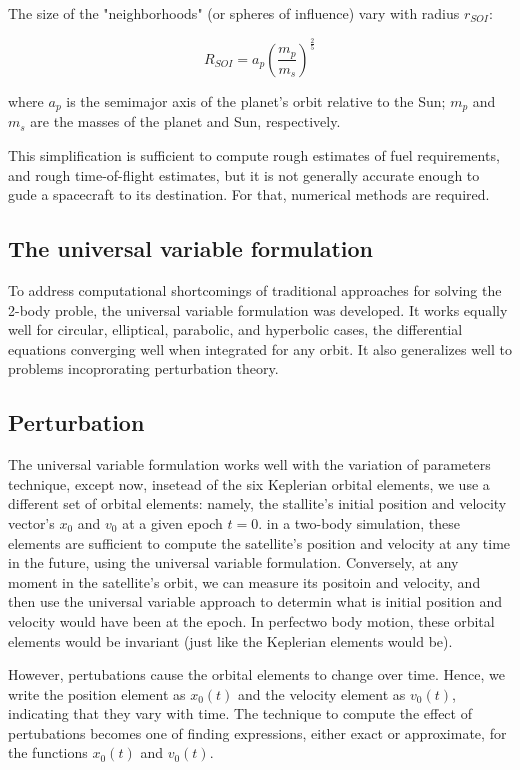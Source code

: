 \documentclass[12pt]{article}
\begin{document}
The size of the "neighborhoods" (or spheres of influence) vary with radius \(r_{SOI}\):

\[R_{SOI} = a_p{\left(\frac{m_p}{m_s}\right)}^{\frac{2}{5}}\]

where \(a_p\) is the semimajor axis of the planet's orbit relative to the Sun; \(m_p\) and \(m_s\) are the masses of the planet and Sun, respectively.

This simplification is sufficient to compute rough estimates of fuel requirements, and rough time-of-flight estimates, but it is not generally accurate enough to gude a spacecraft to its destination. For that, numerical methods are required.

\subsection{The universal variable formulation}

To address computational shortcomings of traditional approaches for solving the 2-body proble, the universal variable formulation was developed. It works equally well for circular, elliptical, parabolic, and hyperbolic cases, the differential equations converging well when integrated for any orbit. It also generalizes well to problems incoprorating perturbation theory.

\subsection{Perturbation}

The universal variable formulation works well with the variation of parameters technique, except now, insetead of the six Keplerian orbital elements, we use a different set of orbital elements: namely, the stallite's initial position and velocity vector's \(x_0\) and \(v_0\) at a given epoch \(t=0\). in a two-body simulation, these elements are sufficient to compute the satellite's position and velocity at any time in the future, using the universal variable formulation. Conversely, at any moment in the satellite's orbit, we can measure its positoin and velocity, and then use the universal variable approach to determin what is initial position and velocity would have been at the epoch. In perfectwo body motion, these orbital elements would be invariant (just like the Keplerian elements would be).

However, pertubations cause the orbital elements to change over time. Hence, we write the position element as \(x_0(t)\) and the velocity element as \(v_0(t)\), indicating that they vary with time. The technique to compute the effect of pertubations becomes one of finding expressions, either exact or approximate, for the functions \(x_0(t)\) and \(v_0(t)\).
\end{document}
